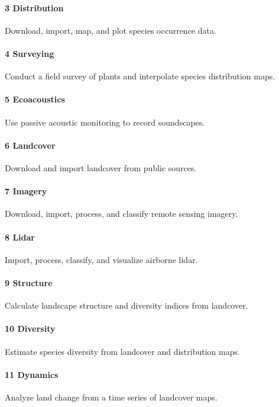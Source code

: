 \documentclass[11pt,article,oneside]{memoir}
\begin{document}
\paragraph{3 Distribution} Download, import, map, and plot species occurrence data.\dotfill

\paragraph{4 Surveying} Conduct a field survey of plants and interpolate species distribution maps.\dotfill 

\paragraph{5 Ecoacoustics} Use passive acoustic monitoring to record soundscapes.\dotfill

\paragraph{6 Landcover} Download and import landcover from public sources.\dotfill

\paragraph{7 Imagery} Download, import, process, and classify remote sensing imagery.\dotfill

\paragraph{8 Lidar} Import, process, classify, and visualize airborne lidar.\dotfill

\paragraph{9 Structure} Calculate landscape structure and diversity indices from landcover.\dotfill

\paragraph{10 Diversity} Estimate species diversity from landcover and distribution maps.\dotfill

\paragraph{11 Dynamics} Analyze land change from a time series of landcover maps.\dotfill
\end{document}
